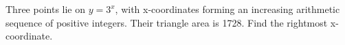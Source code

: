Three points lie on $y=3^x$, with x-coordinates forming an increasing arithmetic sequence of positive integers. Their triangle area is 1728. Find the rightmost x-coordinate.
